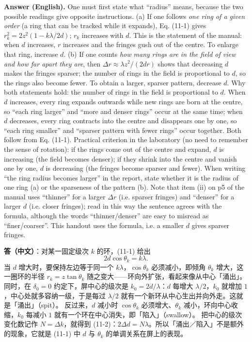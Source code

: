 \documentclass[11pt]{ctexart}
\newcommand{\Dl}{d}
\newcommand{\qaneed}[1]{\needspace{#1\textheight}}
\begin{document}
\textbf{Answer (English).} One must first state what ``radius'' means, because the two possible readings give opposite instructions.
(a) If one follows \emph{one ring of a given order} (a ring that can be tracked while it expands), Eq. (11-1) gives $r_k^2=2z^2(1-k\lambda/2\Dl)$; $r_k$ increases with $\Dl$. This is the statement of the manual: when $\Dl$ increases, $r$ increases and the fringes gush out of the centre. To enlarge that ring, increase $\Dl$.
(b) If one counts \emph{how many rings are in the field of view and how far apart they are}, then $\Delta r\approx\lambda z^2/(2\Dl r)$ shows that decreasing $\Dl$ makes the fringes sparser; the number of rings in the field is proportional to $\Dl$, so the rings also become fewer. To obtain a larger, sparser pattern, decrease $\Dl$.
Why both statements hold: the number of rings in the field is proportional to $\Dl$. When $\Dl$ increases, every ring expands outwards while new rings are born at the centre, so ``each ring larger'' and ``more and denser rings'' occur at the same time; when $\Dl$ decreases, every ring contracts into the centre and disappears one by one, so ``each ring smaller'' and ``sparser pattern with fewer rings'' occur together. Both follow from Eq. (11-1).
Practical criterion in the laboratory (no need to remember the sense of rotation): if the rings come out of the centre and expand, $\Dl$ is increasing (the field becomes denser); if they shrink into the centre and vanish one by one, $\Dl$ is decreasing (the fringes become sparser and fewer). When writing ``the ring radius becomes larger'' in the report, state whether it is the radius of one ring (a) or the sparseness of the pattern (b). Note that item (ii) on p5 of the manual uses ``thinner'' for a larger $\Delta r$ (i.e. sparser fringes) and ``denser'' for a larger $\Dl$ (i.e. closer fringes); read in this way the sentence agrees with the formula, although the words ``thinner/denser'' are easy to misread as ``finer/coarser''. This handout uses the formula, i.e. a smaller $\Dl$ gives sparser fringes.

\qaneed{0.66}


\textbf{答（中文）}：对某一固定级次 $k$ 的环，(11-1) 给出
\[
  2\Dl\cos\theta_k=k\lambda .
\]
当 $\Dl$ 增大时，要保持左边等于同一个 $k\lambda$，$\cos\theta_k$ 必须减小，即倾角 $\theta_k$ 增大，这一圈环的半径 $r_k=z\tan\theta_k$ 随之变大——环向外扩张，看起来像从中心「涌出」。
同时，在 $\delta_0=0$ 约定下，屏中心的级次是 $k_0=2\Dl/\lambda$：$\Dl$ 每增大 $\lambda/2$，$k_0$ 就增加 $1$，中心处就多容纳一级，于是每过 $\lambda/2$ 就有一个新环从中心生出并向外走。这就是「涌出」（spit）。
反过来，$\Dl$ 减小时 $\cos\theta_k$ 必须增大、$\theta_k$ 减小，环向中心收缩，$k_0$ 每减小 $1$ 就有一个环在中心消失，即「陷入」（swallow）。
把中心的级次变化数记作 $N=\Delta k$，就得到 (11-2)：$2\Delta\Dl=N\lambda$。所以「涌出／陷入」不是额外的现象，它就是 (11-1) 中 $\Dl$ 与 $\theta_k$ 的单调关系在屏上的表现。
\end{document}
